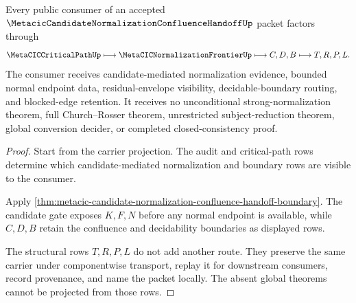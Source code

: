 \begin{theorem}
\label{thm:metacic-candidate-normalization-confluence-handoff-consumer-boundary}
Every public consumer of an accepted $\MetacicCandidateNormalizationConfluenceHandoffUp$ packet factors through
$$
\MetaCICCriticalPathUp \longmapsto \MetaCICNormalizationFrontierUp \longmapsto C,D,B \longmapsto T,R,P,L .
$$
The consumer receives candidate-mediated normalization evidence, bounded normal endpoint data, residual-envelope visibility, decidable-boundary routing, and blocked-edge retention. It receives no unconditional strong-normalization theorem, full Church--Rosser theorem, unrestricted subject-reduction theorem, global conversion decider, or completed closed-consistency proof.
\end{theorem}
\begin{proof}
Start from the carrier projection. The audit and critical-path rows determine which candidate-mediated normalization and boundary rows are visible to the consumer.

Apply \autoref{thm:metacic-candidate-normalization-confluence-handoff-boundary}. The candidate gate exposes $K,F,N$ before any normal endpoint is available, while $C,D,B$ retain the confluence and decidability boundaries as displayed rows.

The structural rows $T,R,P,L$ do not add another route. They preserve the same carrier under componentwise transport, replay it for downstream consumers, record provenance, and name the packet locally. The absent global theorems cannot be projected from those rows.
\end{proof}

